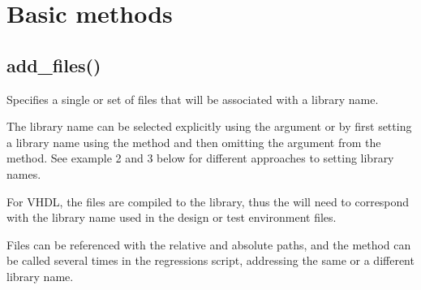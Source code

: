 \documentclass[letterpaper,10pt,english]{sphinxmanual}
\begin{document}
\section{Basic methods}
\label{\detokenize{api:basic-methods}}

\subsection{add\_files()}
\label{\detokenize{api:add-files}}
\begin{DUlineblock}{0em}
\item[] Specifies a single or set of files that will be associated with a library name.
\item[] The library name can be selected explicitly using the  argument or by first setting a library name
using the {\hyperref[\detokenize{api:set-library}]{}} method and then omitting the  argument from the  method.
See example 2 and 3 below for different approaches to setting library names.
\item[] For VHDL, the files are compiled to the  library, thus the  will need to correspond
with the library name used in the design or test environment files.
\end{DUlineblock}

\sphinxAtStartPar
Files can be referenced with the relative and absolute paths, and the {\hyperref[\detokenize{api:add-files}]{}} method
can be called several times in the regressions script, addressing the same or a different library name.

\begin{sphinxVerbatim}[commandchars=\\\{\}]
     

\end{sphinxVerbatim}
\end{document}
